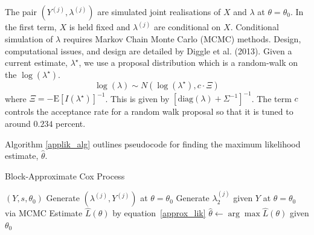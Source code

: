 \documentclass{acm_proc_article-sp}
\begin{document}
The pair $(Y^{(j)}, \lambda^{(j)})$ are simulated joint realisations of $X$ and $\lambda$ at $\theta = \theta_0$.  In the first term, $X$ is held fixed and $\lambda^{(j)}$ are conditional on $X$.  Conditional simulation of $\lambda$ requires Markov Chain Monte Carlo (MCMC) methods.  Design, computational issues, and design are detailed by Diggle et al. (2013).  Given a current estimate, $\lambda^\star$, we use a proposal distribution which is a random-walk on the $\log (\lambda^\star)$.
\begin{equation*}
\log (\lambda) \sim N \left( \log \left( \lambda^\star\right) , c \cdot \Xi \right)
\end{equation*}
where $\Xi = - \text{E} \left[ I(\lambda^\star) \right]^{-1}$.  This is given by $\left[ \text{diag} \left( \lambda \right) + \Sigma^{-1} \right]^{-1}$.  The term $c$ controls the acceptance rate for a random walk proposal so that it is tuned to around $0.234$ percent.

Algorithm \ref{applik_alg} outlines pseudocode for finding the maximum likelihood estimate, $\hat{\theta}$.

\begin{algorithm}[!h]
\caption{Block-Approximate Cox Process} \label{applik_alg}
\begin{algorithmic}
$(Y, s, \theta_0)$
\STATE Generate $(\lambda^{(j)}, Y^{(j)})$ at $\theta = \theta_0$
\STATE Generate $\lambda_2^{(j)}$ given $Y$ at $\theta = \theta_0$ via MCMC
\ENDFOR
\STATE Estimate $\hat{L} (\theta)$ by equation~\eqref{approx_lik}
\STATE $\hat{\theta} \gets \arg \max \hat{L} (\theta)$ given $\theta_0$
\end{algorithmic}
\end{algorithm}
\end{document}
